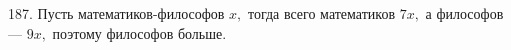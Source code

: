 187. Пусть математиков-философов $x,$ тогда всего математиков $7x,$ а философов --- $9x,$ поэтому философов больше.\\
